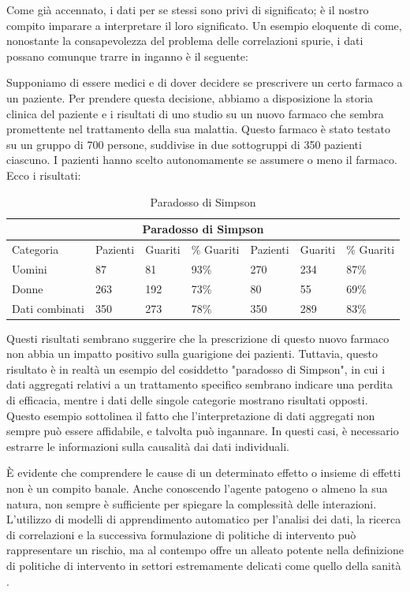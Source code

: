 Come già accennato, i dati per se stessi sono privi di significato; 
è il nostro compito imparare a interpretare il loro significato. 
Un esempio eloquente di come, nonostante la consapevolezza del problema 
delle correlazioni spurie, i dati possano comunque trarre in inganno 
è il seguente:

Supponiamo di essere medici e di dover decidere se prescrivere un 
certo farmaco a un paziente. Per prendere questa decisione, abbiamo 
a disposizione la storia clinica del paziente e i risultati di uno 
studio su un nuovo farmaco che sembra promettente nel trattamento 
della sua malattia. Questo farmaco è stato testato su un gruppo di 
700 persone, suddivise in due sottogruppi di 350 pazienti ciascuno. 
I pazienti hanno scelto autonomamente se assumere o meno il farmaco.
Ecco i risultati:

\begin{table}[H]
    \centering
    \caption{Paradosso di Simpson}
    \begin{tabular}{ |p{2.2cm}||p{1.6cm}|p{1.6cm}|p{1.6cm}||p{1.6cm}|p{1.6cm}|p{1.6cm}| }
        \hline
        \multicolumn{7}{|c|}{Paradosso di Simpson} \\
        \hline
        Categoria & Pazienti & Guariti & \% Guariti & Pazienti & Guariti & \% Guariti\\
        \hline
        Uomini & 87 & 81 & 93\% & 270 & 234 & 87\% \\
        Donne & 263 & 192 & 73\% & 80 & 55 & 69\% \\
        Dati combinati & 350 & 273 & 78\% & 350 & 289 & 83\% \\
        \hline
    \end{tabular}
\end{table}

Questi risultati sembrano suggerire che la prescrizione di questo 
nuovo farmaco non abbia un impatto positivo sulla guarigione dei 
pazienti. Tuttavia, questo risultato è in realtà un esempio del 
cosiddetto "paradosso di Simpson", in cui i dati aggregati relativi 
a un trattamento specifico sembrano indicare una perdita di efficacia, 
mentre i dati delle singole categorie mostrano risultati opposti. 
Questo esempio sottolinea il fatto che l'interpretazione di dati 
aggregati non sempre può essere affidabile, e talvolta può ingannare. 
In questi casi, è necessario estrarre le informazioni sulla causalità 
dai dati individuali.

È evidente che comprendere le cause di un determinato effetto o 
insieme di effetti non è un compito banale. Anche conoscendo 
l'agente patogeno o almeno la sua natura, non sempre è sufficiente 
per spiegare la complessità delle interazioni. 
L'utilizzo di modelli di apprendimento automatico per l'analisi dei 
dati, la ricerca di correlazioni e la successiva formulazione di 
politiche di intervento può rappresentare un rischio, ma al contempo 
offre un alleato potente nella definizione di politiche di intervento 
in settori estremamente delicati come quello della sanità 
\cite{doi:10.1098/rsos.220638}.